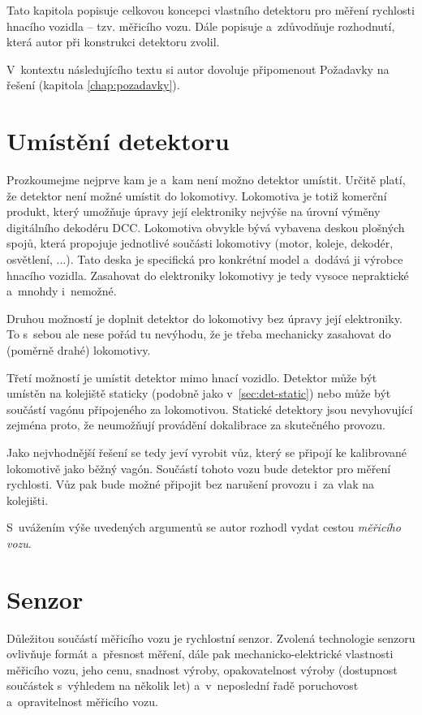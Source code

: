Tato kapitola popisuje celkovou koncepci vlastního detektoru pro měření
rychlosti hnacího vozidla -- tzv. měřicího vozu. Dále popisuje
a~zdůvodňuje rozhodnutí, která autor při konstrukci detektoru zvolil.

V~kontextu následujícího textu si autor dovoluje připomenout Požadavky
na řešení (kapitola \ref{chap:pozadavky}).

\section{Umístění detektoru}
\label{sec:wsm-senzor-umisteni}

Prozkoumejme nejprve kam je a~kam není možno detektor umístit. Určitě platí, že
detektor není možné umístit do lokomotivy. Lokomotiva je totiž komerční produkt,
který umožňuje úpravy její elektroniky nejvýše na úrovní výměny digitálního
dekodéru \gls{DCC}. Lokomotiva obvykle bývá vybavena deskou plošných spojů, která
propojuje jednotlivé součásti lokomotivy (motor, koleje, dekodér, osvětlení,
...). Tato deska je specifická pro konkrétní model a~dodává ji výrobce hnacího
vozidla. Zasahovat do elektroniky lokomotivy je tedy vysoce nepraktické
a~mnohdy i~nemožné.

Druhou možností je doplnit detektor do lokomotivy bez úpravy její elektroniky.
To s~sebou ale nese pořád tu nevýhodu, že je třeba mechanicky zasahovat do
(poměrně drahé) lokomotivy.

Třetí možností je umístit detektor mimo hnací vozidlo. Detektor může být
umístěn na kolejiště staticky (podobně jako v~\ref{sec:det-static}) nebo může
být součástí vagónu připojeného za lokomotivou. Statické detektory jsou
nevyhovující zejména proto, že neumožňují provádění dokalibrace za skutečného
provozu.

Jako nejvhodnější řešení se tedy jeví vyrobit vůz, který se připojí ke kalibrované
lokomotivě jako běžný vagón. Součástí tohoto vozu bude detektor pro měření
rychlosti. Vůz pak bude možné připojit bez narušení provozu i~za vlak na
 kolejišti.

S~uvážením výše uvedených argumentů se autor rozhodl vydat cestou
\textit{měřicího vozu}.

\section{Senzor}
\label{sec:wsm-senzor}

Důležitou součástí měřicího vozu je rychlostní senzor. Zvolená technologie
senzoru ovlivňuje formát a~přesnost měření, dále pak me\-cha\-nic\-ko-elek\-t\-ric\-ké
vlastnosti měřicího vozu, jeho cenu, snadnost výroby, opakovatelnost výroby
(dostupnost součástek s~výhledem na několik let) a~v~neposlední řadě
poruchovost a~opravitelnost měřicího vozu.

